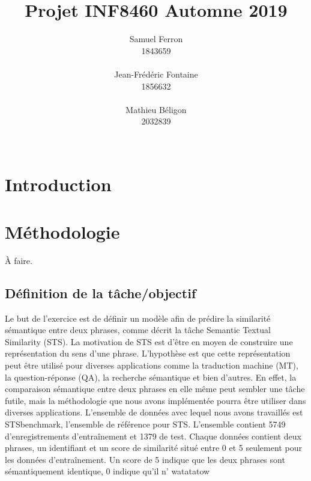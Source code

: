\documentclass[11pt,a4paper, french]{article}
\title{Projet INF8460 Automne 2019 }
\author{Samuel Ferron \\
  1843659 \\
  {\tt } \\\And
  Jean-Frédéric Fontaine \\
  1856632 \\
  {\tt} \\\And
  Mathieu B\'eligon \\
  2032839\\
  {\tt } \\}
\date{}
\begin{document}
\maketitle

\section{Introduction}

  

%

\section{Méthodologie}

À faire. 

\subsection{Définition de la tâche/objectif}
Le but de l’exercice est de définir un modèle afin de prédire la similarité sémantique entre deux phrases, comme décrit la tâche Semantic Textual Similarity (STS). La motivation de STS est d’être en moyen de construire une représentation du sens d’une phrase. L’hypothèse est que cette représentation peut être utilisé pour diverses applications comme la traduction machine (MT), la question-réponse (QA), la recherche sémantique et bien d’autres. En effet, la comparaison sémantique entre deux phrases en elle même peut sembler une tâche futile, mais la méthodologie que nous avons implémentée pourra être utiliser dans diverses applications. L’ensemble de données avec lequel nous avons travaillés est STSbenchmark, l’ensemble de référence pour STS. L’ensemble contient 5749 d’enregistrements d'entraînement et 1379 de test. Chaque données contient deux phrases, un identifiant et un score de similarité situé entre 0 et 5 seulement pour les données d'entraînement. Un score de 5 indique que les deux phrases sont sémantiquement identique, 0 indique qu’il n’ watatatow
\end{document}
